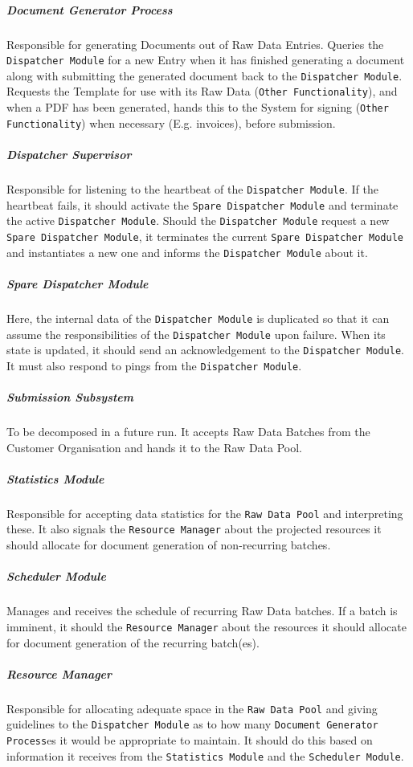 \documentclass[a4paper,10pt]{article}
\begin{document}
\subparagraph{Document Generator Process}
Responsible for generating Documents out of Raw Data Entries. Queries the \texttt{Dispatcher Module} for a new Entry when it has finished generating a document along with submitting the generated document back to the \texttt{Dispatcher Module}. Requests the Template for use with its Raw Data (\texttt{Other Functionality}), and when a PDF has been generated, hands this to the System for signing (\texttt{Other Functionality}) when necessary (E.g. invoices), before submission.

\subparagraph{Dispatcher Supervisor}
Responsible for listening to the heartbeat of the \texttt{Dispatcher Module}. If the heartbeat fails, it should activate the \texttt{Spare Dispatcher Module} and terminate the active \texttt{Dispatcher Module}. Should the \texttt{Dispatcher Module} request a new \texttt{Spare Dispatcher Module}, it terminates the current \texttt{Spare Dispatcher Module} and instantiates a new one and informs the \texttt{Dispatcher Module} about it.

\subparagraph{Spare Dispatcher Module}
Here, the internal data of the \texttt{Dispatcher Module} is duplicated so that it can assume the responsibilities of the \texttt{Dispatcher Module} upon failure. When its state is updated, it should send an acknowledgement to the \texttt{Dispatcher Module}. It must also respond to pings from the \texttt{Dispatcher Module}.

\subparagraph{Submission Subsystem}
To be decomposed in a future run. It accepts Raw Data Batches from the Customer Organisation and hands it to the Raw Data Pool.

\subparagraph{Statistics Module}
Responsible for accepting data statistics for the \texttt{Raw Data Pool} and interpreting these. It also signals the \texttt{Resource Manager} about the projected resources it should allocate for document generation of non-recurring batches.

\subparagraph{Scheduler Module}
Manages and receives the schedule of recurring Raw Data batches. If a batch is imminent, it should the \texttt{Resource Manager} about the resources it should allocate for document generation of the recurring batch(es).

\subparagraph{Resource Manager}
Responsible for allocating adequate space in the \texttt{Raw Data Pool} and giving guidelines to the \texttt{Dispatcher Module} as to how many \texttt{Document Generator Process}es it would be appropriate to maintain. It should do this based on information it receives from the \texttt{Statistics Module} and the \texttt{Scheduler Module}.
\end{document}
